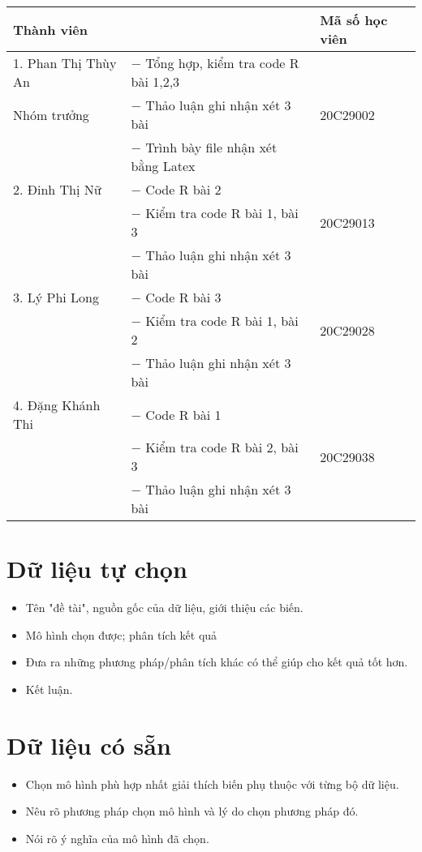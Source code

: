 \documentclass[a4paper]{book}
\begin{document}
\begin{table}[H]
	\centering
	\begin{tabular}{|m{4.5cm}||m{8cm}|m{3.5cm}|} 
		\hline
		\textbf{Thành viên} & \centering{\textbf{Công việc}} & \textbf{Mã số học viên}\\
		\hline
		1. Phan Thị Thùy An & $-$ Tổng hợp, kiểm tra code R bài 1,2,3 & \\
		Nhóm trưởng & $-$ Thảo luận ghi nhận xét 3 bài & 20C29002 \\
		& $-$ Trình bày file nhận xét bằng Latex & \\
		\hline
		2. Đinh Thị Nữ  & $-$ Code R bài 2& \\
		& $-$ Kiểm tra code R bài 1, bài 3& 20C29013\\
		& $-$ Thảo luận ghi nhận xét 3 bài& \\
		\hline
		3. Lý Phi Long & $-$ Code R bài 3& \\
		& $-$ Kiểm tra code R bài 1, bài 2& 20C29028\\
		& $-$ Thảo luận ghi nhận xét 3 bài& \\
		\hline
		4. Đặng Khánh Thi & $-$ Code R bài 1& \\
		& $-$ Kiểm tra code R bài 2, bài 3 & 20C29038 \\
		& $-$ Thảo luận ghi nhận xét 3 bài & \\
		\hline
	\end{tabular}
\end{table}

\chapter{Dữ liệu tự chọn}
\begin{itemize}
	\item Tên "đề tài", nguồn gốc của dữ liệu, giới thiệu các biến.
	\item Mô hình chọn được; phân tích kết quả
	\item Đưa ra những phương pháp/phân tích khác có thể giúp cho kết quả tốt hơn.
	\item Kết luận.
\end{itemize}




\chapter{Dữ liệu có sẵn}
\begin{itemize}
	\item Chọn mô hình phù hợp nhất giải thích biến phụ thuộc với từng bộ dữ liệu.
	\item Nêu rõ phương pháp chọn mô hình và lý do chọn phương pháp đó.
	\item Nói rõ ý nghĩa của mô hình đã chọn.
\end{itemize}





\end{document}
